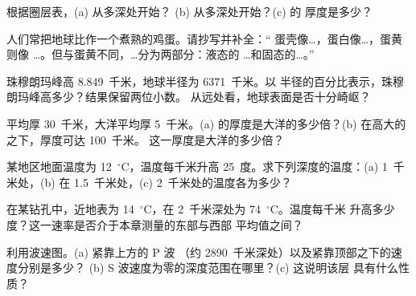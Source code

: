 \begin{exercise}[$\star$]\label{exo:g6:inside-the-earth:3}
根据圈层表，(a) 从多深处开始？
(b) 从多深处开始？(c) 的
厚度是多少？
\end{exercise}

\begin{exercise}[$\star$]\label{exo:g6:inside-the-earth:4}
人们常把地球比作一个煮熟的鸡蛋。请抄写并补全：“
蛋壳像\ldots，蛋白像\ldots{}，蛋黄则像
\ldots{}。但与蛋黄不同，\ldots{}分为两部分：液态的
\ldots{}和固态的\ldots{}。”
\end{exercise}

\begin{exercise}[$\star\star$]\label{exo:g6:inside-the-earth:5}
珠穆朗玛峰高 8.849~千米，地球半径为 6371~千米。以
半径的百分比表示，珠穆朗玛峰高多少？结果保留两位小数。
从远处看，地球表面是否十分崎岖？
\end{exercise}

\begin{exercise}[$\star\star$]\label{exo:g6:inside-the-earth:6}
平均厚 30~千米，大洋平均厚
5~千米。(a) 的厚度是大洋的多少倍？(b) 在高大的
之下，厚度可达 100~千米。
这一厚度是大洋的多少倍？
\end{exercise}

\begin{exercise}[$\star\star$]\label{exo:g6:inside-the-earth:7}
某地区地面温度为 12~$^\circ$C，温度每千米升高
25~度。求下列深度的温度：(a) 1~千米处，(b) 在
1.5~千米处，(c) 2~千米处的温度各为多少？
\end{exercise}

\begin{exercise}[$\star\star$]\label{exo:g6:inside-the-earth:8}
在某钻孔中，近地表为 14~$^\circ$C，在
2~千米深处为 74~$^\circ$C。温度每千米
升高多少度？这一速率是否介于本章测量的东部与西部
平均值之间？
\end{exercise}

\begin{exercise}[$\star\star$]\label{exo:g6:inside-the-earth:9}
利用波速图。(a) 紧靠上方的 P 波
（约 2890~千米深处）以及紧靠顶部之下的速度分别是多少？
(b) S 波速度为零的深度范围在哪里？(c) 这说明该层
具有什么性质？
\end{exercise}

